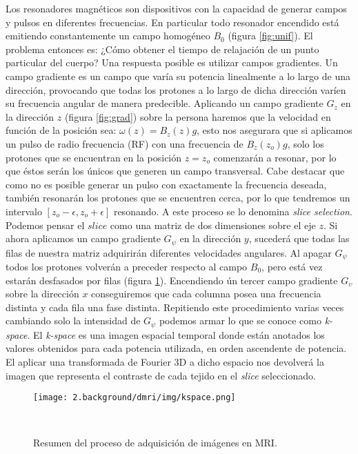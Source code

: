 Los resonadores magn\'eticos son dispositivos con la capacidad de generar 
campos y pulsos en diferentes frecuencias. En particular todo resonador
encendido est\'a emitiendo constantemente un campo homog\'eneo $B_0$
(figura \ref{fig:unif}). El problema entonces es: ¿C\'omo obtener el tiempo
de relajaci\'on de un punto particular del cuerpo? Una respuesta posible
es utilizar campos gradientes. Un campo gradiente es un campo que var\'ia
su potencia linealmente a lo largo de una direcci\'on, provocando que todas
los protones a lo largo de dicha direcci\'on var\'ien su frecuencia
angular de manera predecible. Aplicando un campo gradiente $G_z$ en la
direcci\'on $z$ (figura \ref{fig:grad}) sobre la persona haremos que la
velocidad en funci\'on de la posici\'on sea: $\omega(z) = B_z(z) g$, esto
nos asegurara que si aplicamos un pulso de radio frecuencia (RF) con una
frecuencia de $B_z(z_o) g$, solo los protones que se encuentran en la
posici\'on $z=z_o$ comenzar\'an a resonar, por lo que \'estos ser\'an los
\'unicos que generen un campo transversal. Cabe destacar que como no es
posible generar un pulso con exactamente la frecuencia deseada, tambi\'en
resonar\'an los protones que se encuentren cerca, por lo que tendremos un
intervalo $[z_o-\epsilon,z_o+\epsilon]$ resonando. A este proceso se lo
denomina \textit{slice selection}. Podemos pensar el $slice$ como una
matriz
de dos dimensiones sobre el eje $z$. Si ahora aplicamos un campo gradiente
$G_\psi$ en la direcci\'on $y$, suceder\'a que todas las  filas de nuestra
matriz adquirir\'an diferentes velocidades angulares. Al apagar $G_\psi$
todos los protones volver\'an a preceder respecto al campo $B_0$, pero est\'a
vez estar\'an desfasados por filas (figura \ref{fig:kspace}). Encendiendo 
\'un tercer campo gradiente $G_\upsilon$ sobre la direcci\'on $x$
conseguiremos que cada columna posea una frecuencia distinta y cada fila
una fase distinta. Repitiendo este procedimiento varias veces cambiando
solo la intensidad de $G_\psi$ podemos armar lo que se conoce como 
\textit{k-space}. El \textit{k-space} es una imagen espacial temporal
donde est\'an anotados los valores obtenidos para cada potencia utilizada,
en orden ascendente de potencia. El aplicar una transformada de Fourier 3D
a dicho espacio nos devolver\'a la imagen que representa el contraste de
cada tejido en el \textit{slice} seleccionado. \\

\begin{figure}[h!]
                                                                                                                        
\begin{minipage}[b]{\textwidth}
    \texttt{[image: 2.background/dmri/img/kspace.png]}
    \caption{Resumen del proceso de adquisici\'on de im\'agenes en MRI.}
    \label{fig:kspace}
\end{minipage} ~

\end{figure}  




